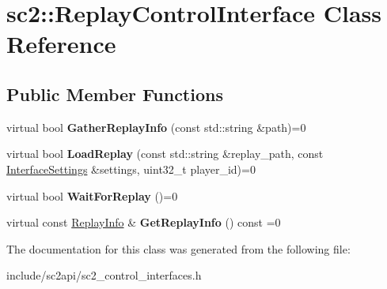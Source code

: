 \hypertarget{classsc2_1_1_replay_control_interface}{}\section{sc2\+:\+:Replay\+Control\+Interface Class Reference}
\label{classsc2_1_1_replay_control_interface}
\subsection*{Public Member Functions}
\begin{DoxyCompactItemize}
\item 
\mbox{\label{classsc2_1_1_replay_control_interface_aab153d035390b9e87a6fc7e31da46fbc}} 
virtual bool {\bfseries Gather\+Replay\+Info} (const std\+::string \&path)=0
\item 
\mbox{\label{classsc2_1_1_replay_control_interface_ad3d5fe4c38b7e1fe1c09b2557374e904}} 
virtual bool {\bfseries Load\+Replay} (const std\+::string \&replay\+\_\+path, const \hyperlink{structsc2_1_1_interface_settings}{Interface\+Settings} \&settings, uint32\+\_\+t player\+\_\+id)=0
\item 
\mbox{\label{classsc2_1_1_replay_control_interface_af7bc6661abca0916236f3d00363b072e}} 
virtual bool {\bfseries Wait\+For\+Replay} ()=0
\item 
\mbox{\label{classsc2_1_1_replay_control_interface_ae14304ff62e00d1f7f99f6d2876c9444}} 
virtual const \hyperlink{structsc2_1_1_replay_info}{Replay\+Info} \& {\bfseries Get\+Replay\+Info} () const =0
\end{DoxyCompactItemize}


The documentation for this class was generated from the following file\+:\begin{DoxyCompactItemize}
\item 
include/sc2api/sc2\+\_\+control\+\_\+interfaces.\+h\end{DoxyCompactItemize}
